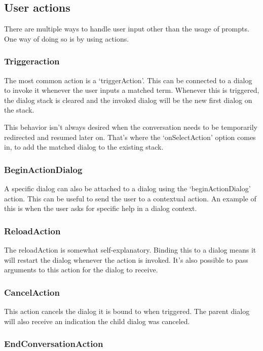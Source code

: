 \subsection{User actions}

There are multiple ways to handle user input other than the usage of prompts. One way of doing so is by using actions.

\subsubsection{Triggeraction}

The most common action is a `triggerAction'. This can be connected to a dialog to invoke it whenever the user inputs a matched term. Whenever this is triggered, the dialog stack is cleared and the invoked dialog will be the new first dialog on the stack.

This behavior isn't always desired when the conversation needs to be temporarily redirected and resumed later on. That's where the `onSelectAction' option comes in, to add the matched dialog to the existing stack.

\subsubsection{BeginActionDialog}

A specific dialog can also be attached to a dialog using the `beginActionDialog' action. This can be useful to send the user to a contextual action. An example of this is when the user asks for specific help in a dialog context.

\subsubsection{ReloadAction}

The reloadAction is somewhat self-explanatory. Binding this to a dialog means it will restart the dialog whenever the action is invoked. It's also possible to pass arguments to this action for the dialog to receive.

\subsubsection{CancelAction}

This action cancels the dialog it is bound to when triggered. The parent dialog will also receive an indication the child dialog was canceled.

\subsubsection{EndConversationAction}

